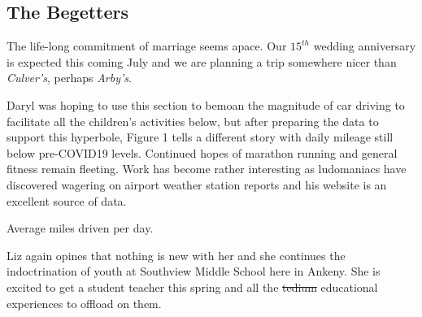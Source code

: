 \documentclass[letterpaper,11pt]{article}
\makeatletter
\newenvironment{figurehere}
  {\def\@captype{figure}}
  {}
\makeatother
\begin{document}
\begin{multicols}{2}
\bigskip

\subsection{The Begetters}

The life-long commitment of marriage seems apace.  Our ${15}^{th}$ wedding anniversary
is expected this coming July and we are planning a trip somewhere nicer than
\textit{Culver's}, perhaps \textit{Arby's}.

Daryl was hoping to use this section to bemoan the magnitude of car driving to
facilitate all the children's activities below, but after preparing the data
to support this hyperbole, Figure 1 tells a different story with daily mileage
still below pre-\textsc{COVID19} levels.  Continued hopes
of marathon running and general fitness remain fleeting.  Work has become
rather interesting as ludomaniacs have discovered wagering on airport
weather station reports and his website is an excellent source of data.

\bigskip

\begin{figurehere}
    \centering   
    \caption{Average miles driven per day.}
\end{figurehere}

Liz again opines that nothing is new with her and she continues the
indoctrination of youth at Southview Middle School here in Ankeny.
She is excited to get a
student teacher this spring and all the \sout{tedium}
educational experiences to offload on them.


\end{multicols}
\end{document}
